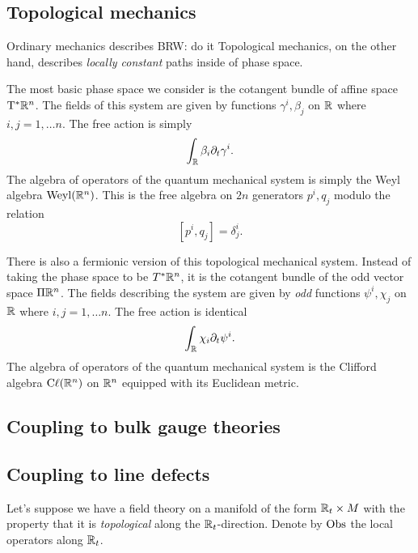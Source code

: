 \documentclass[11pt]{amsart}
\def\brian#1{{\textcolor{blue!65!red}{BRW: {#1}}}}
\begin{document}
\subsection*{Topological mechanics}


Ordinary mechanics describes \brian{do it}
Topological mechanics, on the other hand, describes {\em locally constant} paths inside of phase space.

The most basic phase space we consider is the cotangent bundle of affine space ${\rm T}^* \mathbb R^n$.
The fields of this system are given by functions $\gamma^i, \beta_j$ on $\mathbb R$ where $i,j=1,\ldots n$. 
The free action is simply
\[
\int_\mathbb R \beta_i \partial_t \gamma^i .
\]
The algebra of operators of the quantum mechanical system is simply the Weyl algebra ${\rm Weyl}(\mathbb R^n)$.
This is the free algebra on $2n$ generators $p^i, q_j$ modulo the relation
\[
[p^i, q_j] = \delta^i_j .
\]

There is also a fermionic version of this topological mechanical system. 
Instead of taking the phase space to be $T^* \mathbb R^n$, it is the cotangent bundle of the odd vector space $\Pi \mathbb R^n$.
The fields describing the system are given by {\em odd} functions $\psi^i, \chi_j$ on $\mathbb R$ where $i,j=1,\ldots n$. 
The free action is identical
\[
\int_\mathbb R \chi_i \partial_t \psi^i .
\]
The algebra of operators of the quantum mechanical system is the Clifford algebra ${\rm C}\ell(\mathbb R^n)$ on $\mathbb R^n$ equipped with its Euclidean metric. 



\subsection*{Coupling to bulk gauge theories}

\subsection{Coupling to line defects} 

Let's suppose we have a field theory on a manifold of the form $\mathbb R_t \times M$ with the property that it is {\em topological} along the $\mathbb R_t$-direction. 
Denote by ${\rm Obs}$ the local operators along $\mathbb R_t$. 
\end{document}

